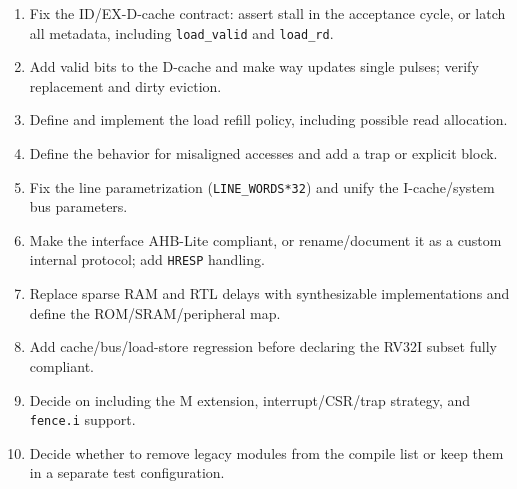 \documentclass[]{article}
\providecommand{\tightlist}{%
  \setlength{\itemsep}{0pt}\setlength{\parskip}{0pt}}
\begin{document}
\begin{enumerate}
\def\labelenumi{\arabic{enumi}.}
\tightlist
\item
  Fix the ID/EX-D-cache contract: assert stall in the acceptance cycle,
  or latch all metadata, including \texttt{load\_valid} and
  \texttt{load\_rd}.
\item
  Add valid bits to the D-cache and make way updates single pulses;
  verify replacement and dirty eviction.
\item
  Define and implement the load refill policy, including possible read
  allocation.
\item
  Define the behavior for misaligned accesses and add a trap or explicit
  block.
\item
  Fix the line parametrization (\texttt{LINE\_WORDS*32}) and unify the
  I-cache/system bus parameters.
\item
  Make the interface AHB-Lite compliant, or rename/document it as a
  custom internal protocol; add \texttt{HRESP} handling.
\item
  Replace sparse RAM and RTL delays with synthesizable implementations
  and define the ROM/SRAM/peripheral map.
\item
  Add cache/bus/load-store regression before declaring the RV32I subset
  fully compliant.
\item
  Decide on including the M extension, interrupt/CSR/trap strategy, and
  \texttt{fence.i} support.
\item
  Decide whether to remove legacy modules from the compile list or keep
  them in a separate test configuration.
\end{enumerate}
\end{document}
